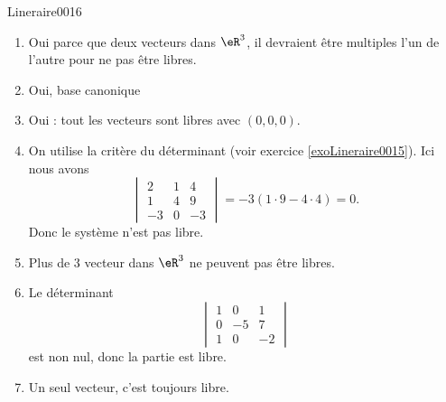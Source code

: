 \begin{corrige}{Lineraire0016}

	\begin{enumerate}

		\item
			Oui parce que deux vecteurs dans $\eR^3$, il devraient être multiples l'un de l'autre pour ne pas être libres.
		\item
			Oui, base canonique

		\item
			Oui : tout les vecteurs sont libres avec $(0,0,0)$.
		\item
			On utilise la critère du déterminant (voir exercice \ref{exoLineraire0015}). Ici nous avons
			\begin{equation}
				\begin{vmatrix}
					2	&	1	&	4	\\
					1	&	4	&	9	\\
					-3	&	0	&	-3
				\end{vmatrix}
				=-3(1\cdot 9-4\cdot 4)=0.
			\end{equation}
			Donc le système n'est pas libre.

		\item
			Plus de $3$ vecteur dans $\eR^3$ ne peuvent pas être libres.
		\item
			Le déterminant
			\begin{equation}
				\begin{vmatrix}
					1	&	0	&	1	\\
					0	&	-5	&	7	\\
					1	&	0	&	-2
				\end{vmatrix}
			\end{equation}
			est non nul, donc la partie est libre.

		\item
			Un seul vecteur, c'est toujours libre.

	\end{enumerate}
	

\end{corrige}
